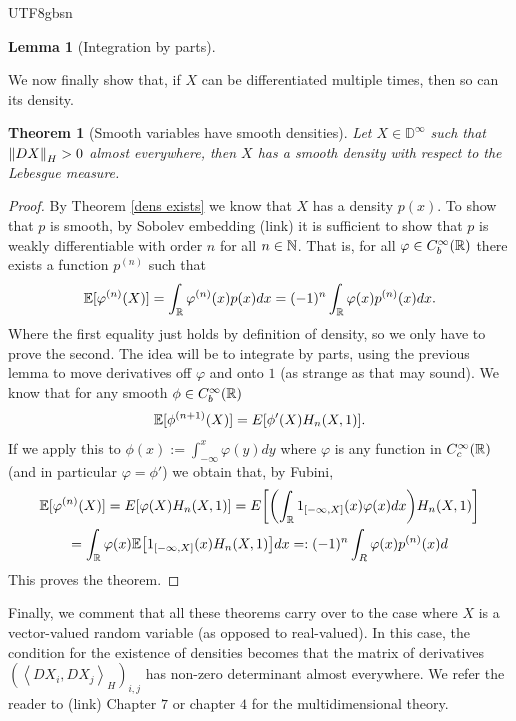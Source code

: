 \documentclass[12pt]{article}
\newtheorem{theorem}{Theorem}
\newtheorem{lemma}{Lemma}
\newcommand{\br}[1]{\left\langle#1\right\rangle}
\begin{document}
\begin{CJK*}{UTF8}{gbsn}
\begin{lemma}[Integration by parts]
	\end{lemma}
	We now finally show that, if $X$ can be differentiated multiple times, then so can its density.
	\begin{theorem}[Smooth variables have smooth densities]
		Let $X\in \mathbb{D}^\infty$ such that  $\norm{DX}_{H}>0$ almost everywhere, then $X$ has a smooth density with respect to the Lebesgue measure.
	\end{theorem}
	\begin{proof}
		By Theorem \ref{dens exists} we know that $X$ has a density  $p(x)$. To show that  $p$ is smooth, by Sobolev embedding (link) it is sufficient to show that $p$ is weakly differentiable with order $n$
		for all $n \in \mathbb{N}$. That is, for all $\varphi\in C_b^\infty({\mathbb R})$ there exists a function
		$p^{(n)}$ such that
		\begin{equation*}
			\mathbb{E}[\varphi^{(n)}(X)]=\int_{{\mathbb R}}\varphi^{(n)}(x)p(x) dx=(-1)^n\int_{{\mathbb R}}\varphi(x) p^{(n)}(x) dx.
		\end{equation*}
		Where the first equality just holds by definition of density, so we only have to prove the second. The idea will be to integrate by parts, using the previous lemma to move derivatives off $\varphi$ and onto $1$ (as strange as that may sound). We know that for any smooth $\phi\in C_b^\infty({\mathbb R})$
		\begin{equation*}
			\mathbb{E}[\phi^{(n+1)}(X)]=E[\phi'(X)H_n(X,1)].
		\end{equation*}
		If we apply this to $\phi(x):=\int_{-\infty}^x \varphi(y) dy$ where $\varphi$ is any function in $C_c^\infty({\mathbb R})$ (and in particular $\varphi=\phi'$) we obtain that, by Fubini,
		\begin{multline*}
			\mathbb{E}[\varphi^{(n)}(X)]=E[\varphi(X)H_n(X,1)]= E\qty[\qty(\int_{{\mathbb R}}1_{[-\infty,X]}(x) \varphi(x)dx) H_n(X,1)]\\=\int_{{\mathbb R}}\varphi(x)\mathbb{E}\qty[1_{[-\infty,X]}(x)H_n(X,1)] dx=:(-1)^n \int_{R}\varphi(x) p^{(n)}(x) d
		\end{multline*}
		This proves the theorem.
	\end{proof}
	Finally, we comment that all these theorems carry over to the case where $X$ is a vector-valued random variable (as opposed to real-valued). In this case, the condition
	for the existence of densities becomes that the matrix of derivatives $(\br{DX_i,DX_j}_{H})_{i,j}$ has non-zero determinant almost everywhere. We refer the reader to \cite{nualart2018introduction} (link)
	Chapter  $7$ or \cite{hairer2021introduction}  chapter $4$ for the multidimensional theory.

\end{CJK*}




\end{document}
